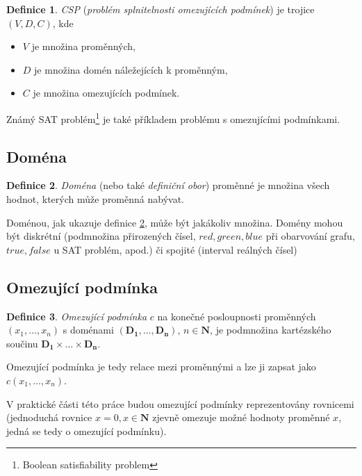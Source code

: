 \documentclass[thesis=B,czech]{FITthesis}[2012/06/26]
\theoremstyle{definition}
\newtheorem{definition}{Definice}
\begin{document}
\begin{definition}
\label{def:csp}
\emph{CSP} (\emph{problém splnitelnosti omezujících podmínek}) je trojice $(V, D, C)$, kde
\begin{itemize}
  \item $V$ je množina proměnných,
  \item $D$ je množina domén náležejících k proměnným,
  \item $C$ je množina omezujících podmínek.
\end{itemize}
\end{definition}

Známý SAT problém\footnote{Boolean satisfiability problem} je také příkladem problému s omezujícími podmínkami.


\subsection{Doména}
\begin{definition}
\label{def:domain}
\emph{Doména} (nebo také \emph{definiční obor}) proměnné je množina všech hodnot, kterých může proměnná nabývat.
\end{definition}

Doménou, jak ukazuje definice \ref{def:domain}, může být jakákoliv množina. Domény mohou být diskrétní (podmnožina přirozených čísel, ${red, green, blue}$ při obarvování grafu, ${true, false}$ u SAT problém, apod.) či spojité (interval reálných čísel)


\subsection{Omezující podmínka}
\begin{definition}
\label{def:constraint}
\emph{Omezující podmínka} $c$ na konečné posloupnosti proměnných\\$(x_1, \dots, x_n)$ s doménami $(\boldsymbol{D_1}, \dots, \boldsymbol{D_n})$, $n \in \boldsymbol{N}$, je podmnožina kartézského součinu $\boldsymbol{D_1} \times \dots \times \boldsymbol{D_n}$.
\end{definition}

Omezující podmínka je tedy relace mezi proměnnými a lze ji zapsat jako $c(x_1, \dots, x_n)$.

V praktické části této práce budou omezující podmínky reprezentovány rovnicemi (jednoduchá rovnice $x = 0, x \in \boldsymbol{N}$ zjevně omezuje možné hodnoty proměnné $x$, jedná se tedy o omezující podmínku).
\end{document}

